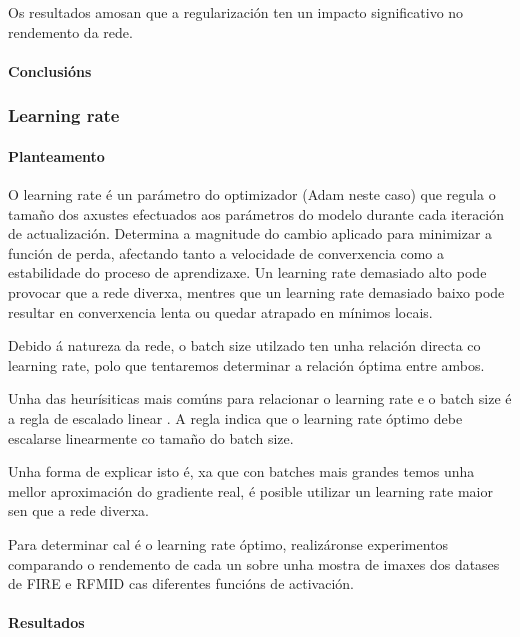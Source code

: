 Os resultados amosan que a regularización ten un impacto significativo no rendemento da rede.

\paragraph{Conclusións}
\label{par:Conclusions-regularization}

\subsubsection{Learning rate}
\label{subsubsec:Learning rate}

\paragraph{Planteamento}
\label{par:Planteamento-learningrate}

O learning rate é un parámetro do optimizador (Adam neste caso) que regula o tamaño dos axustes efectuados aos parámetros do modelo durante cada iteración de actualización. Determina a magnitude do cambio aplicado para minimizar a función de perda, afectando tanto a velocidade de converxencia como a estabilidade do proceso de aprendizaxe.
Un learning rate demasiado alto pode provocar que a rede diverxa, mentres que un learning rate demasiado baixo pode resultar en converxencia lenta ou quedar atrapado en mínimos locais.

Debido á natureza da rede, o batch size utilzado ten unha relación directa co learning rate, polo que tentaremos determinar a relación óptima entre ambos.

Unha das heurísiticas mais comúns para relacionar o learning rate e o batch size é a regla de escalado linear \cite{goyal2018accuratelargeminibatchsgd}. 
A regla indica que o learning rate óptimo debe escalarse linearmente co tamaño do batch size. 

Unha forma de explicar isto é, xa que con batches mais grandes temos unha mellor aproximación do gradiente real, é posible utilizar un learning rate maior sen que a rede diverxa.

Para determinar cal é o learning rate óptimo, realizáronse experimentos comparando o rendemento de cada un sobre unha mostra de imaxes dos datases de FIRE e RFMID cas diferentes funcións de activación.

\paragraph{Resultados}
\label{par:Resultados-learningrate}


